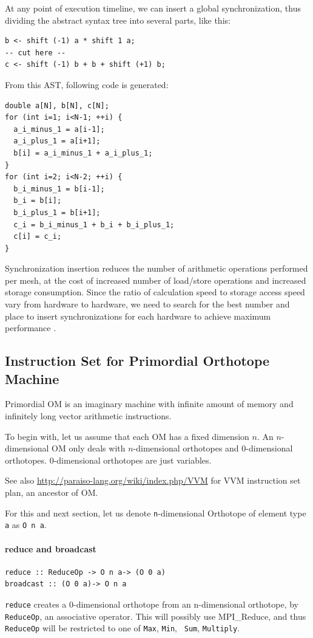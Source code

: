 \documentclass[twocolumn]{article}
\begin{document}
At any point of execution timeline, we can insert a global
synchronization, thus dividing the abstract syntax tree into several
parts, like this:

\begin{verbatim}
b <- shift (-1) a * shift 1 a;
-- cut here --
c <- shift (-1) b + b + shift (+1) b;
\end{verbatim}

From this AST, following code is generated:

\begin{verbatim}
double a[N], b[N], c[N];
for (int i=1; i<N-1; ++i) {
  a_i_minus_1 = a[i-1];
  a_i_plus_1 = a[i+1];
  b[i] = a_i_minus_1 + a_i_plus_1;
}
for (int i=2; i<N-2; ++i) {
  b_i_minus_1 = b[i-1];
  b_i = b[i];
  b_i_plus_1 = b[i+1];
  c_i = b_i_minus_1 + b_i + b_i_plus_1;
  c[i] = c_i;
}
\end{verbatim}

Synchronization insertion reduces the number of arithmetic operations
performed per mesh, at the cost of increased number of load/store
operations and increased storage consumption. Since the ratio of
calculation speed to storage access speed vary from hardware to
hardware, we need to search for the best number and place to insert
synchronizations for each hardware to achieve maximum performance .




\subsection{Instruction Set for Primordial Orthotope Machine}
Primordial OM is an imaginary machine with infinite amount of memory and
infinitely long vector arithmetic instructions. 

To begin with, let us assume that each OM has a fixed dimension $n$. An
$n$-dimensional OM only deals with $n$-dimensional orthotopes and
0-dimensional orthotopes. 0-dimensional orthotopes are just variables.

See also \url{http://paraiso-lang.org/wiki/index.php/VVM} for VVM instruction
set plan, an ancestor of OM.

For this and next section, let us denote {\tt n}-dimensional Orthotope of
element type {\tt a} as {\tt O n a}.

\paragraph{reduce and broadcast}
\begin{verbatim}
reduce :: ReduceOp -> O n a-> (O 0 a)
broadcast :: (O 0 a)-> O n a
\end{verbatim}
{\tt reduce} creates a 0-dimensional orthotope from an n-dimensional orthotope, by {\tt
  ReduceOp}, an associative operator. This will possibly use MPI\_Reduce, and
thus {\tt ReduceOp} will be restricted to one of {\tt Max}, {\tt Min}, {\tt
  Sum}, {\tt Multiply}.
\end{document}
